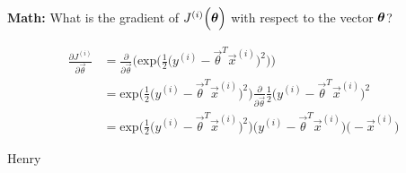 \begin{parts}
\begin{subparts}
    \subpart[2] \textbf{Math:} What is the gradient of $J^{(i)}\Big(\boldsymbol \theta\Big)$ with respect to the vector $\boldsymbol \theta$?
    \begin{tcolorbox}[fit,height=3cm, width=15cm, blank, borderline={1pt}{-2pt}]
    \end{tcolorbox}
    \begin{soln}
        \begin{align}
            \frac{\partial J^{(i)}}{\partial \vec{\theta}} &= \frac{\partial}{\partial \vec{\theta}}\Bigg(\textrm{exp}\bigg(\frac{1}{2}\Big(y^{(i)} - \vec{\theta}^T\vec{x}^{(i)}\Big)^2\bigg)\Bigg) \nonumber \\ 
            &= \textrm{exp}\bigg(\frac{1}{2}\Big(y^{(i)} - \vec{\theta}^T\vec{x}^{(i)}\Big)^2\bigg)\frac{\partial}{\partial \vec{\theta}}\frac{1}{2}\Big(y^{(i)} - \vec{\theta}^T\vec{x}^{(i)}\Big)^2 \nonumber \\
            &= \textrm{exp}\bigg(\frac{1}{2}\Big(y^{(i)} - \vec{\theta}^T\vec{x}^{(i)}\Big)^2\bigg)\Big(y^{(i)} - \vec{\theta}^T\vec{x}^{(i)}\Big)\Big(-\vec{x}^{(i)}\Big) \nonumber
        \end{align}
    \end{soln}
    \begin{qauthor}
       Henry
    \end{qauthor}
    

\end{subparts}
\end{parts}
